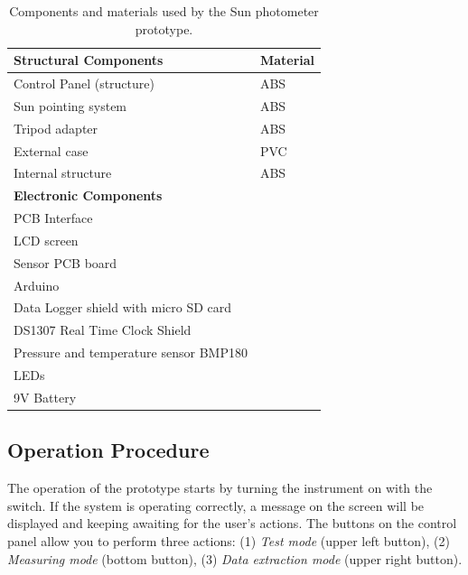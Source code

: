 \documentclass[12pt,letterpaper]{article}
\numberwithin{figure}{section}
\numberwithin{equation}{section}
\numberwithin{table}{section}
\begin{document}
\begin{table}[!htb]
\centering
\caption{Components and materials used by the Sun photometer prototype.}
\label{tab:2}
\begin{tabular}{|l|l|}
\hline
\textbf{Structural Components}    & \textbf{Material} \\ \hline
Control Panel (structure)         & ABS               \\ \hline
Sun pointing system               & ABS               \\ \hline
Tripod adapter                    & ABS               \\ \hline
External case                     & PVC               \\ \hline
Internal structure                & ABS               \\ \hline
\textbf{Electronic Components}    & \textbf{}         \\ \hline
PCB Interface                     &                   \\ \hline
LCD screen                        &                   \\ \hline
Sensor PCB board                  &                   \\ \hline
Arduino                           &                   \\ \hline
Data Logger shield with micro SD card &                   \\ \hline
DS1307 Real Time Clock Shield     &                   \\ \hline
Pressure and temperature sensor BMP180 &                   \\ \hline
LEDs                              &                   \\ \hline
9V Battery                        &                   \\ \hline
\end{tabular}
\end{table}




\subsection{Operation Procedure}

The operation of the prototype starts by turning the instrument on with the switch. If the system is operating correctly, a message on the screen will be displayed and keeping awaiting for the user's actions. The buttons on the control panel allow you to perform three actions: (1) \textit{Test mode} (upper left button), (2) \textit{Measuring mode} (bottom button), (3) \textit{Data extraction mode} (upper right button).
\end{document}
